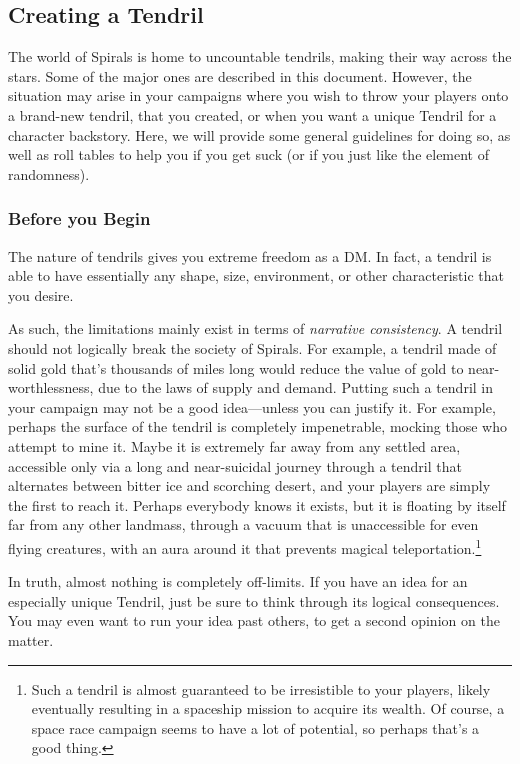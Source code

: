 \begin{multicols*}{2}
\subsection{Creating a Tendril}
The world of Spirals is home to uncountable tendrils, making their way across the stars.
Some of the major ones are described in this document.
However, the situation may arise in your campaigns where you wish to throw your players onto a brand-new tendril, that you created, or when you want a unique Tendril for a character backstory.
Here, we will provide some general guidelines for doing so, as well as roll tables to help you if you get suck (or if you just like the element of randomness).

\subsubsection*{Before you Begin}
The nature of tendrils gives you extreme freedom as a DM.
In fact, a tendril is able to have essentially any shape, size, environment, or other characteristic that you desire.

As such, the limitations mainly exist in terms of \textit{narrative consistency}.
A tendril should not logically break the society of Spirals.
For example, a tendril made of solid gold that's thousands of miles long would reduce the value of gold to near-worthlessness, due to the laws of supply and demand.
Putting such a tendril in your campaign may not be a good idea---unless you can justify it.
For example, perhaps the surface of the tendril is completely impenetrable, mocking those who attempt to mine it.
Maybe it is extremely far away from any settled area, accessible only via a long and near-suicidal journey through a tendril that alternates between bitter ice and scorching desert, and your players are simply the first to reach it.
Perhaps everybody knows it exists, but it is floating by itself far from any other landmass, through a vacuum that is unaccessible for even flying creatures, with an aura around it that prevents magical teleportation.\footnote{Such a tendril is almost guaranteed to be irresistible to your players, likely eventually resulting in a spaceship mission to acquire its wealth. Of course, a space race campaign seems to have a lot of potential, so perhaps that's a good thing.}

In truth, almost nothing is completely off-limits.
If you have an idea for an especially unique Tendril, just be sure to think through its logical consequences.
You may even want to run your idea past others, to get a second opinion on the matter.



\end{multicols*}
